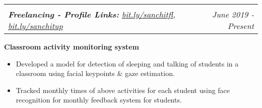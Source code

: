 \documentclass[letterpaper,10.9pt]{article}
\makeatletter
\newcommand{\resumeSubheading}[4]{
  \vspace{-1pt}\item[]
  \begin{tabular*}{0.98\textwidth}{l@{\extracolsep{\fill}}r}
      \hspace{-10pt}\textbf{#1} & #2 \\
      \hspace{-10pt}\textit{\small#3} & \textit{\small #4} \\
    \end{tabular*}\vspace{-5pt}
}
\newcommand{\resumeSubHeadingListStart}{\begin{itemize}[leftmargin=*]}
\newcommand{\resumeSubHeadingListEnd}{\end{itemize}}
\makeatother
\begin{document}
          \vspace{-5pt}
                    \vspace{-8pt}
              \resumeSubheading
      \small
      \item{\textbf{Freelancing - Profile Links:} \href{http://bit.ly/sanchitfl}{\color{blue} bit.ly/sanchitfl}, \href{http://bit.ly/sanchitup}{\color{blue} bit.ly/sanchitup}}{ June 2019 - Present}
      \vspace{-5pt}
      \item{\textbf{Classroom activity monitoring system}} 
      \vspace{-5pt}
      \resumeSubHeadingListStart
      \item{Developed a model for detection of sleeping and talking of students in a classroom using facial keypoints \& gaze estimation.}
      \item{Tracked monthly times of above activities for each student using face recognition for monthly feedback system for students.}
        \resumeSubHeadingListEnd
      \vspace{-5pt}
\end{document}
